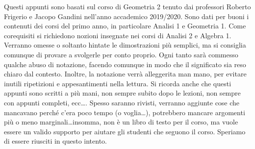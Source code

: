 Questi appunti sono basati sul corso di Geometria 2 tenuto dai professori
Roberto Frigerio e Jacopo Gandini nell'anno accademico 2019/2020. Sono dati per
buoni i contenuti dei corsi del primo anno, in particolare Analisi 1 e Geometria
1. Come corequisiti si richiedono nozioni insegnate nei corsi di Analisi 2 e Algebra 1. Verranno omesse o soltanto hintate le dimostrazioni più semplici, ma si consiglia comunque di provare a svolgerle per conto proprio. Ogni tanto sarà
commesso qualche abuso di notazione, facendo comunque in modo che il significato
sia reso chiaro dal contesto. Inoltre, la notazione verrà alleggerita man mano,
per evitare inutili ripetizioni e appesantimenti nella lettura. Si ricorda anche
che questi appunti sono scritti a più mani, non sempre subito dopo le lezioni,
non sempre con appunti completi, ecc\dots. Spesso saranno rivisti, verranno
aggiunte cose che mancavano perché c'era poco tempo (o voglia\dots), potrebbero
mancare argomenti più o meno marginali\dots insomma, non è un libro di testo per
il corso, ma vuole essere un valido supporto per aiutare gli studenti che
seguono il corso. Speriamo di essere riusciti in questo intento.
